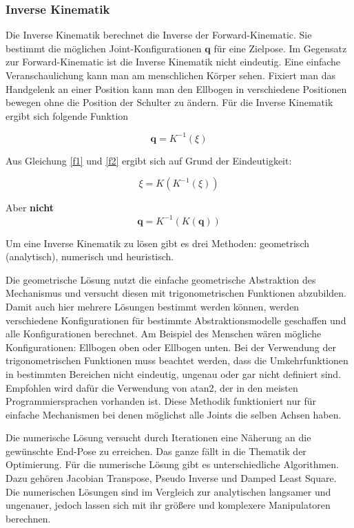 \subsubsection{Inverse Kinematik}

Die Inverse Kinematik berechnet die Inverse der Forward-Kinematic. Sie bestimmt die möglichen Joint-Konfigurationen $\textbf{q}$ für eine Zielpose. Im Gegensatz zur Forward-Kinematic ist die Inverse Kinematik nicht eindeutig. Eine einfache Veranschaulichung kann man am menschlichen Körper sehen. Fixiert man das Handgelenk an einer Position kann man den Ellbogen in verschiedene Positionen bewegen ohne die Position der Schulter zu ändern. Für die Inverse Kinematik ergibt sich folgende Funktion\cite{Corke2011}


\begin{equation}
\textbf{q} = K^{-1}(\xi)
\label{f2}
\end{equation}

Aus Gleichung \ref{f1} und \ref{f2} ergibt sich auf Grund der Eindeutigkeit:

\begin{displaymath}
\xi = K(K^{-1}(\xi))
\end{displaymath}

Aber \textbf{nicht}
\begin{displaymath}
\textbf{q} = K^{-1}(K(\textbf{q}))
\end{displaymath}

Um eine Inverse Kinematik zu lösen gibt es drei Methoden: geometrisch (analytisch), numerisch und heuristisch.\cite{danielasteidl2011}

Die geometrische Lösung nutzt die einfache geometrische Abstraktion des Mechanismus und versucht diesen mit trigonometrischen Funktionen abzubilden. Damit auch hier mehrere Lösungen bestimmt werden können, werden verschiedene Konfigurationen für bestimmte Abstraktionsmodelle geschaffen und alle Konfigurationen berechnet. Am Beispiel des Menschen wären mögliche Konfigurationen: Ellbogen oben oder Ellbogen unten. Bei der Verwendung der trigonometrischen Funktionen muss beachtet werden, dass die Umkehrfunktionen in bestimmten Bereichen nicht eindeutig, ungenau oder gar nicht definiert sind. Empfohlen wird dafür die Verwendung von atan2, der in den meisten Programmiersprachen vorhanden ist. Diese Methodik funktioniert nur für einfache Mechanismen bei denen möglichst alle Joints die selben Achsen haben.

Die numerische Lösung versucht durch Iterationen eine Näherung an die gewünschte End-Pose zu erreichen. Das ganze fällt in die Thematik der Optimierung. Für die numerische Lösung gibt es unterschiedliche Algorithmen. Dazu gehören Jacobian Transpose, Pseudo Inverse und Damped Least Square. Die numerischen Lösungen sind im Vergleich zur analytischen langsamer und ungenauer, jedoch lassen sich mit ihr größere und komplexere Manipulatoren berechnen.\cite{danielasteidl2011}

